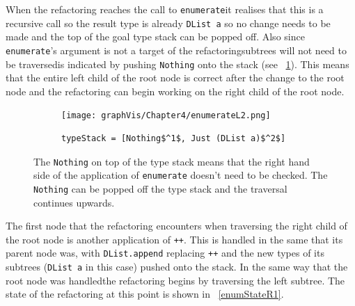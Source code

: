 When the refactoring reaches the call to \texttt{enumerate}\DIFaddbegin \DIFadd{, }\DIFaddend it realises that this is a recursive call so the result type is already \texttt{DList a} so no change needs to be made and the top of the goal type stack can be popped off. Also since \texttt{enumerate}'s argument is not a target of the refactoring\DIFdelbegin {}\DIFdelend \DIFaddbegin {}\DIFaddend subtrees will not need to be traversed\DIFdelbegin {}\DIFdelend \DIFaddbegin {}\DIFaddend is indicated by pushing \texttt{Nothing} onto the stack (see \DIFdelbegin {}\DIFdelend \DIFaddbegin {}\DIFaddend ~\ref{enumStateL2}). This means that the entire left child of the root node is correct after the change to the root node and the refactoring can begin working on the right child of the root node.

\begin{figure}[t]
	\begin{subfigure}{\linewidth}
		\texttt{[image: graphVis/Chapter4/enumerateL2.png]}
	\end{subfigure}\par\medskip

	\begin{subfigure}{\linewidth}
		\begin{lstlisting}[mathescape]
			typeStack = [Nothing$^1$, Just (DList a)$^2$]
		\end{lstlisting}
	\end{subfigure}\par\medskip
\caption{The \texttt{Nothing} on top of the type stack means that the right hand side of the application of \texttt{enumerate} doesn't need to be checked. The \texttt{Nothing} can be popped off the type stack and the traversal continues upwards.}
\label{enumStateL2}
\end{figure}

The first node that the refactoring encounters when traversing the right child of the root node is another application of \texttt{++}. This is handled in the same that its parent node was, with \texttt{DList.append} replacing \texttt{++} and the new types of its subtrees (\texttt{DList a} in this case) pushed onto the stack. In the same way that the root node was handled\DIFaddbegin \DIFadd{, }\DIFaddend the refactoring begins by traversing the left subtree. The state of the refactoring at this point is shown in \DIFdelbegin {}\DIFdelend \DIFaddbegin {}\DIFaddend ~\ref{enumStateR1}.

